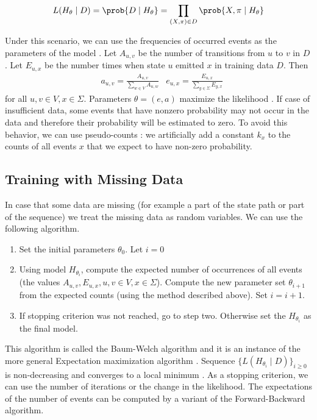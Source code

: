 \[L(H_\theta\mid D)=\prob{D\mid H_\theta}= \prod_{(X,\pi)\in D}\prob{X,\pi\mid H_\theta}\]

Under this scenario, we can use the frequencies of occurred events as the parameters of the model \cite{Durbin1998}.
Let $A_{u,v}$ be the number of transitions from $u$ to $v$ in $D$.
Let $E_{u,x}$ be the number times when state $u$ emitted $x$ in training data
$D$.
Then 
\begin{align*}
&a_{u,v}=\frac{A_{u,v}}{\sum_{w\in V}A_{u,w}}
&e_{u,x}=\frac{E_{u,x}}{\sum_{y\in\Sigma}E_{y,x}}
\end{align*}
for all $u,v\in V, x\in\Sigma$. Parameters $\theta=(e,a)$ maximize the likelihood
\cite{Durbin1998}. If case of insufficient data, some events that have
nonzero probability may not occur in the data and therefore their probability will be
estimated to zero. To avoid this behavior, we can use pseudo-counts
\cite{Durbin1998}: we artificially add a constant $k_x$ to the counts of all
events $x$ that we expect to have non-zero probability.

\subsection{Training with Missing Data} 
In case that some data are missing (for example a part
of the state path or part of the sequence) we treat the missing data as random
variables. We can use the following algorithm. 
\begin{enumerate}
\item  Set the initial parameters $\theta_0$. Let $i=0$
\item  Using model $H_{\theta_i}$, compute the expected number of occurrences of
all events (the values $A_{u,v}, E_{u,x}, u,v\in V,x\in\Sigma$). Compute the new
parameter set $\theta_{i+1}$ from the expected counts (using the method
described above). Set $i=i+1$.
\item If stopping criterion was not reached, go to step two. Otherwise 
set the $H_{\theta_{i}}$ as the final model.
\end{enumerate}
This algorithm is called the Baum-Welch algorithm and it is an instance of the
more general Expectation maximization algorithm \cite{Durbin1998}. Sequence $\{L(H_{\theta_i}\mid D)\}_{i\geq 0}$ is non-decreasing and
 converges to a local minimum \cite{Durbin1998}. As a stopping criterion,
we can use the number of iterations or the change in the likelihood.
 The expectations of the number of events can be
computed by a variant of the Forward-Backward algorithm.

